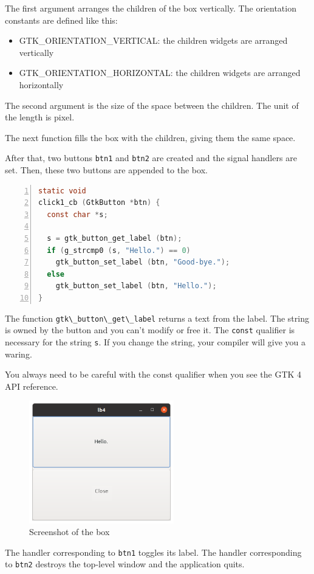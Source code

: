 The first argument arranges the children of the box vertically. The
orientation constants are defined like this:

\begin{itemize}
\tightlist
\item
  GTK\_ORIENTATION\_VERTICAL: the children widgets are arranged
  vertically
\item
  GTK\_ORIENTATION\_HORIZONTAL: the children widgets are arranged
  horizontally
\end{itemize}

The second argument is the size of the space between the children. The
unit of the length is pixel.

The next function fills the box with the children, giving them the same
space.

After that, two buttons \passthrough{\lstinline!btn1!} and
\passthrough{\lstinline!btn2!} are created and the signal handlers are
set. Then, these two buttons are appended to the box.

\begin{lstlisting}[language=C, numbers=left]
static void
click1_cb (GtkButton *btn) {
  const char *s;

  s = gtk_button_get_label (btn);
  if (g_strcmp0 (s, "Hello.") == 0)
    gtk_button_set_label (btn, "Good-bye.");
  else
    gtk_button_set_label (btn, "Hello.");
}
\end{lstlisting}

The function \passthrough{\lstinline!gtk\_button\_get\_label!} returns a
text from the label. The string is owned by the button and you can't
modify or free it. The \passthrough{\lstinline!const!} qualifier is
necessary for the string \passthrough{\lstinline!s!}. If you change the
string, your compiler will give you a waring.

You always need to be careful with the const qualifier when you see the
GTK 4 API reference.

\begin{figure}
\centering
\includegraphics[width=6.3cm,height=5.325cm]{../image/screenshot_lb4.png}
\caption{Screenshot of the box}
\end{figure}

The handler corresponding to \passthrough{\lstinline!btn1!} toggles its
label. The handler corresponding to \passthrough{\lstinline!btn2!}
destroys the top-level window and the application quits.
